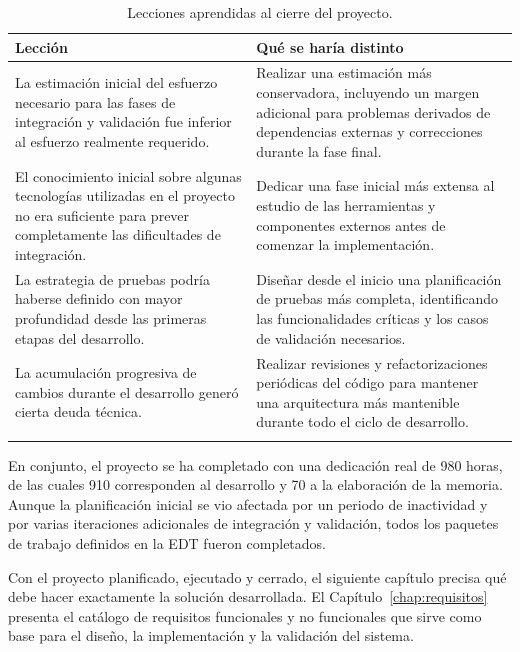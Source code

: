 \begin{longtable}{P{6cm} P{6cm}}
  \toprule
  \textbf{Lección} & \textbf{Qué se haría distinto} \\
  
  \midrule
  
  La estimación inicial del esfuerzo necesario para las fases de integración y validación fue inferior al esfuerzo realmente requerido. &
  Realizar una estimación más conservadora, incluyendo un margen adicional para problemas derivados de dependencias externas y correcciones durante la fase final. \\[0.5em]
  
  El conocimiento inicial sobre algunas tecnologías utilizadas en el proyecto no era suficiente para prever completamente las dificultades de integración. &
  Dedicar una fase inicial más extensa al estudio de las herramientas y componentes externos antes de comenzar la implementación. \\[0.5em]
  
  La estrategia de pruebas podría haberse definido con mayor profundidad desde las primeras etapas del desarrollo. &
  Diseñar desde el inicio una planificación de pruebas más completa, identificando las funcionalidades críticas y los casos de validación necesarios. \\[0.5em]
  
  La acumulación progresiva de cambios durante el desarrollo generó cierta deuda técnica. &
  Realizar revisiones y refactorizaciones periódicas del código para mantener una arquitectura más mantenible durante todo el ciclo de desarrollo. \\
  
  \bottomrule
  \caption{Lecciones aprendidas al cierre del proyecto.}
  \label{tab:lecciones-aprendidas}
\end{longtable}

En conjunto, el proyecto se ha completado con una dedicación real de
980 horas, de las cuales 910 corresponden al desarrollo y 70 a la elaboración
de la memoria. Aunque la planificación inicial se vio afectada por un periodo
de inactividad y por varias iteraciones adicionales de integración y
validación, todos los paquetes de trabajo definidos en la EDT fueron
completados.

Con el proyecto planificado, ejecutado y cerrado, el siguiente capítulo
precisa qué debe hacer exactamente la solución desarrollada. El
Capítulo~\ref{chap:requisitos} presenta el catálogo de requisitos funcionales
y no funcionales que sirve como base para el diseño, la implementación y la
validación del sistema.

